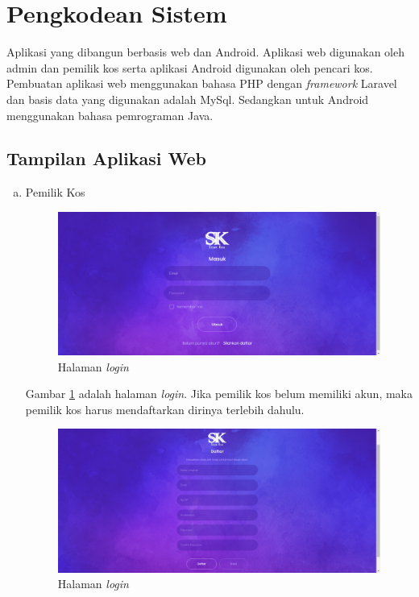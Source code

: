 	\section{Pengkodean Sistem}
	Aplikasi yang dibangun berbasis web dan Android. Aplikasi web digunakan oleh admin dan pemilik kos serta aplikasi Android digunakan oleh pencari kos. Pembuatan aplikasi web menggunakan bahasa PHP dengan \textit{framework} Laravel dan basis data yang digunakan adalah MySql. Sedangkan untuk Android menggunakan bahasa pemrograman Java. 
	
	\subsection{Tampilan Aplikasi Web}

		\begin{enumerate}[a.]
			\item Pemilik Kos
		
		\begin{figure}[H]
			\centering
			\includegraphics[width=\textwidth]{gambar/web/1}
			\caption{Halaman \textit{login}}
			\label{web1}
		\end{figure}
	
		Gambar \ref{web1} adalah halaman \textit{login}. Jika pemilik kos belum memiliki akun, maka pemilik kos harus mendaftarkan dirinya terlebih dahulu.
	
		\begin{figure}[H]
			\centering
			\includegraphics[width=\textwidth]{gambar/web/2}
			\caption{Halaman \textit{login}}
			\label{web2}
		\end{figure}
		

\end{enumerate}
